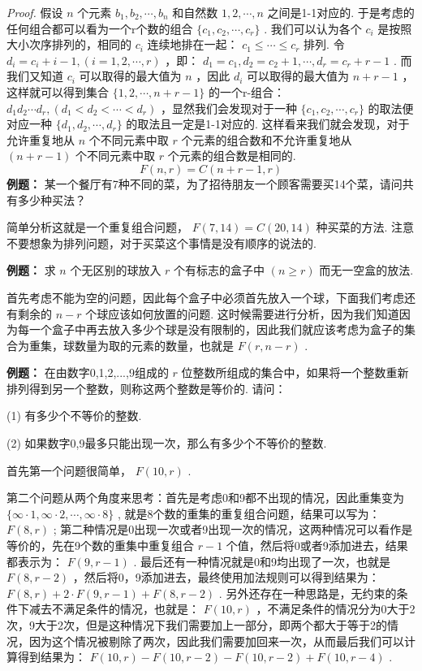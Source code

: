 \documentclass[cn, hazy, blue, normal, 12pt]{elegantnote}
\begin{document}
\textit{Proof.} 假设 $ n $ 个元素 $ b_1,b_2,\cdots,b_n $ 和自然数 $ 1,2,\cdots,n $ 之间是1-1对应的. 于是考虑的任何组合都可以看为一个r个数的组合 $ \{c_1,c_2,\cdots,c_r\} $ .  我们可以认为各个 $ c_i $ 是按照大小次序排列的，相同的 $ c_i $ 连续地排在一起： $ c_1\leq \cdots\leq c_r $ 排列. 令 $ d_i=c_i+i-1,(i=1,2,\cdots,r) $ ，即： $ d_1=c_1,d_2=c_2+1,\cdots,d_r=c_r+r-1 $ . 而我们又知道 $ c_i $ 可以取得的最大值为 $ n $ ，因此 $ d_i $ 可以取得的最大值为 $ n+r-1 $ ，这样就可以得到集合 $ \{1,2,\cdots,n+r-1\} $ 的一个r-组合： $ d_1d_2\cdots d_r,(d_1<d_2<\cdots <d_r) $ ，显然我们会发现对于一种 $ \{c_1,c_2,\cdots,c_r\} $ 的取法便对应一种 $ \{d_1,d_2,\cdots,d_r\} $ 的取法且一定是1-1对应的. 这样看来我们就会发现，对于允许重复地从 $ n $ 个不同元素中取 $ r $ 个元素的组合数和不允许重复地从 $ (n+r-1) $ 个不同元素中取 $ r $ 个元素的组合数是相同的.
$$
    F(n,r)=C(n+r-1,r)
$$
\textbf{例题：} 某一个餐厅有7种不同的菜，为了招待朋友一个顾客需要买14个菜，请问共有多少种买法？

简单分析这就是一个重复组合问题， $ F(7,14)=C(20,14) $ 种买菜的方法. 注意不要想象为排列问题，对于买菜这个事情是没有顺序的说法的.

\textbf{例题：} 求 $ n $ 个无区别的球放入 $ r $ 个有标志的盒子中 $ (n\geq r) $ 而无一空盒的放法.

首先考虑不能为空的问题，因此每个盒子中必须首先放入一个球，下面我们考虑还有剩余的 $ n-r $ 个球应该如何放置的问题. 这时候需要进行分析，因为我们知道因为每一个盒子中再去放入多少个球是没有限制的，因此我们就应该考虑为盒子的集合为重集，球数量为取的元素的数量，也就是 $ F(r,n-r) $ .

\textbf{例题：} 在由数字0,1,2,...,9组成的 $ r $ 位整数所组成的集合中，如果将一个整数重新排列得到另一个整数，则称这两个整数是等价的. 请问：

(1) 有多少个不等价的整数.

(2) 如果数字0,9最多只能出现一次，那么有多少个不等价的整数.

首先第一个问题很简单， $ F(10,r) $ .

第二个问题从两个角度来思考：首先是考虑0和9都不出现的情况，因此重集变为 $ \{\infty \cdot 1,\infty \cdot 2,\cdots,\infty \cdot 8\} $ , 就是8个数的重集的重复组合问题，结果可以写为： $ F(8,r) $ ; 第二种情况是0出现一次或者9出现一次的情况，这两种情况可以看作是等价的，先在9个数的重集中重复组合 $ r-1 $ 个值，然后将0或者9添加进去，结果都表示为： $ F(9,r-1) $ . 最后还有一种情况就是0和9均出现了一次，也就是 $ F(8,r-2) $ ，然后将0，9添加进去，最终使用加法规则可以得到结果为： $ F(8,r)+2\cdot F(9,r-1)+F(8,r-2) $ . 另外还存在一种思路是，无约束的条件下减去不满足条件的情况，也就是： $ F(10,r) $ ，不满足条件的情况分为0大于2次，9大于2次，但是这种情况下我们需要加上一部分，即两个都大于等于2的情况，因为这个情况被剔除了两次，因此我们需要加回来一次，从而最后我们可以计算得到结果为： $ F(10,r)-F(10,r-2)-F(10,r-2)+F(10,r-4) $ .
\end{document}
